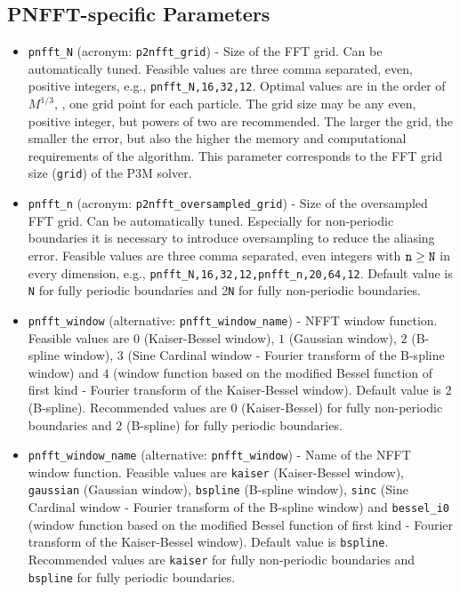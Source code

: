 \subsection{PNFFT-specific Parameters}
\begin{itemize}
  \item \verb!pnfft_N! (acronym: \verb!p2nfft_grid!) -
    Size of the FFT grid. Can be automatically tuned.
    Feasible values are three comma separated, even, positive integers, e.g., \verb!pnfft_N,16,32,12!.
    Optimal values are in the order of $M^{1/3}$, \ie, one grid point for each particle.
    The grid size may be any even, positive integer, but powers of
    two are recommended. The larger the grid, the smaller the
    error, but also the higher the memory and computational requirements
    of the algorithm.
    This parameter corresponds to the FFT grid size (\verb!grid!) of the P3M solver.
  \item \verb!pnfft_n! (acronym: \verb!p2nfft_oversampled_grid!) -
    Size of the oversampled FFT grid. Can be automatically tuned.
    Especially for non-periodic boundaries it is necessary to introduce oversampling to reduce the aliasing error.
    Feasible values are three comma separated, even integers with $\verb!n! \ge \verb!N!$ in every dimension, e.g., \verb!pnfft_N,16,32,12,pnfft_n,20,64,12!.
    Default value is \verb!N! for fully periodic boundaries and 2\verb!N! for fully non-periodic
    boundaries.
  \item \verb!pnfft_window! (alternative: \verb!pnfft_window_name!) -
    NFFT window function. Feasible values are $0$ (Kaiser-Bessel window), $1$ (Gaussian window),
    $2$ (B-spline window), $3$ (Sine Cardinal window - Fourier transform of the B-spline window) and $4$
    (window function based on the modified Bessel function of first kind - Fourier transform of the Kaiser-Bessel window).
    Default value is $2$ (B-spline). Recommended values are $0$ (Kaiser-Bessel) for fully non-periodic boundaries and $2$ (B-spline) for fully periodic boundaries.
  \item \verb!pnfft_window_name! (alternative: \verb!pnfft_window!) -
    Name of the NFFT window function. Feasible values are \verb!kaiser! (Kaiser-Bessel window), \verb!gaussian! (Gaussian window),
    \verb!bspline! (B-spline window), \verb!sinc! (Sine Cardinal window - Fourier transform of the B-spline window) and \verb!bessel_i0!
    (window function based on the modified Bessel function of first kind - Fourier transform of the Kaiser-Bessel window).
    Default value is \verb!bspline!. Recommended values are \verb!kaiser! for fully non-periodic boundaries and \verb!bspline! for fully periodic boundaries.

\end{itemize}
